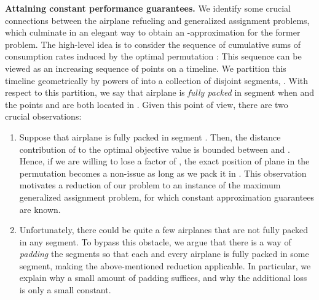 \documentclass[11pt]{article}
\theoremstyle{plain}
\theoremstyle{definition}
\begin{document}
{\bf Attaining constant performance guarantees.} We identify some crucial connections between the airplane refueling and generalized assignment problems, which culminate in an elegant way to obtain an -approximation for the former problem. The high-level idea is to consider the sequence of cumulative sums of consumption rates induced by the optimal permutation :
This sequence can be viewed as an increasing sequence of points on a timeline. We partition this timeline geometrically by powers of  into a collection of disjoint segments, . With respect to this partition, we say that airplane  is \textit{fully packed} in segment  when  and the points  and  are both located in . Given this point of view, there are two crucial observations:
\begin{enumerate}
\item Suppose that airplane  is fully packed in segment . Then, the distance contribution of  to the optimal objective value is bounded between  and . Hence, if we are willing to lose a factor of , the exact position of plane  in the permutation becomes a non-issue as long as we pack it in . This observation motivates a reduction of our problem to an instance of the maximum generalized assignment problem, for which constant approximation guarantees are known.

\item Unfortunately, there could be quite a few airplanes that are not fully packed in any segment. To bypass this obstacle, we argue that there is a way of \textit{padding} the segments so that each and every airplane is fully packed in some segment, making the above-mentioned reduction applicable. In particular, we explain why a small amount of padding suffices, and why the additional loss is only a small constant.
\end{enumerate}
\end{document}
